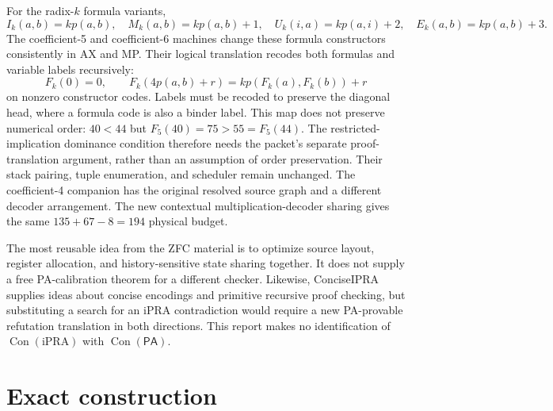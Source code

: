 \documentclass[11pt,a4paper]{article}
\newcommand{\PA}{\mathsf{PA}}
\newcommand{\Con}{\operatorname{Con}}
\begin{document}
For the radix-$k$ formula variants,
\[
 I_k(a,b)=kp(a,b),\quad M_k(a,b)=kp(a,b)+1,\quad
 U_k(i,a)=kp(a,i)+2,\quad E_k(a,b)=kp(a,b)+3.
\]
The coefficient-5 and coefficient-6 machines change these formula
constructors consistently in AX and MP. Their logical translation
recodes both formulas and variable labels recursively:
\[
 F_k(0)=0,\qquad
 F_k(4p(a,b)+r)=kp(F_k(a),F_k(b))+r
\]
on nonzero constructor codes. Labels must be recoded to preserve the
diagonal head, where a formula code is also a binder label. This map
does not preserve numerical order: $40<44$ but
$F_5(40)=75>55=F_5(44)$. The restricted-implication dominance condition
therefore needs the packet's separate proof-translation argument,
rather than an assumption of order preservation. Their stack pairing, tuple
enumeration, and scheduler remain unchanged. The coefficient-4 companion
has the original resolved source graph and a different decoder arrangement.
The new contextual multiplication-decoder sharing gives the same
$135+67-8=194$ physical budget.

The most reusable idea from the ZFC material is to optimize source layout,
register allocation, and history-sensitive state sharing together.
It does not supply a free PA-calibration theorem for a different checker.
Likewise, ConciseIPRA supplies ideas about concise encodings and primitive
recursive proof checking, but substituting a search for an iPRA
contradiction would require a new PA-provable refutation translation in
both directions. This report makes no identification of
$\Con(\mathrm{iPRA})$ with $\Con(\PA)$.

\section{Exact construction}
\end{document}
